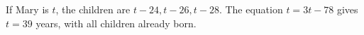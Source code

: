 If Mary is $t$, the children are $t-24,t-26,t-28$. The equation $t=3t-78$ gives $\boxed{t=39}$ years, with all children already born.
